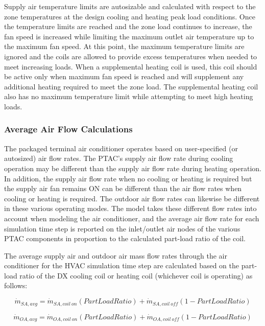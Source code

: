Supply air temperature limits are autosizable and calculated with respect to the zone temperatures at the design cooling and heating peak load conditions. Once the temperature limits are reached and the zone load continues to increase, the fan speed is increased while limiting the maximum outlet air temperature up to the maximum fan speed. At this point, the maximum temperature limits are ignored and the coils are allowed to provide excess temperatures when needed to meet increasing loads. When a supplemental heating coil is used, this coil should be active only when maximum fan speed is reached and will supplement any additional heating required to meet the zone load. The supplemental heating coil also has no maximum temperature limit while attempting to meet high heating loads.

\subsubsection{Average Air Flow Calculations}\label{average-air-flow-calculations-000}

The packaged terminal air conditioner operates based on user-specified (or autosized) air flow rates. The PTAC's supply air flow rate during cooling operation may be different than the supply air flow rate during heating operation. In addition, the supply air flow rate when no cooling or heating is required but the supply air fan remains ON can be different than the air flow rates when cooling or heating is required. The outdoor air flow rates can likewise be different in these various operating modes. The model takes these different flow rates into account when modeling the air conditioner, and the average air flow rate for each simulation time step is reported on the inlet/outlet air nodes of the various PTAC components in proportion to the calculated part-load ratio of the coil.

The average supply air and outdoor air mass flow rates through the air conditioner for the HVAC simulation time step are calculated based on the part-load ratio of the DX cooling coil or heating coil (whichever coil is operating) as follows:

\begin{equation}
  \dot{m}_{SA,avg} = \dot{m}_{SA,coil~on} \left( PartLoadRatio \right) + \dot{m}_{SA,coil~off} \left( 1 - PartLoadRatio \right)
\end{equation}

\begin{equation}
  \dot{m}_{OA,avg} = \dot{m}_{OA,coil~on} \left( PartLoadRatio \right) + \dot{m}_{OA,coil~off} \left( 1 - PartLoadRatio \right)
\end{equation}

